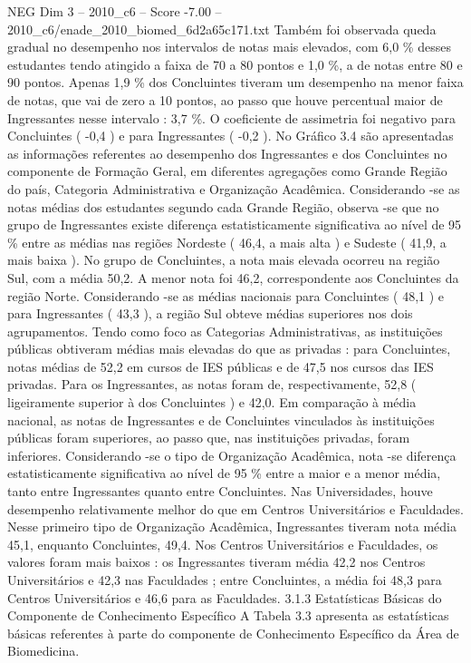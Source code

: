\begin{textsample}{NEG Dim 3 – 2010\_c6 – Score -7.00 – 2010\_c6/enade\_2010\_biomed\_6d2a65c171.txt}
Também foi observada queda gradual no desempenho nos intervalos de notas mais elevados, com 6,0 \% desses estudantes tendo atingido a faixa de 70 a 80 pontos e 1,0 \%, a de notas entre 80 e 90 pontos.
Apenas 1,9 \% dos Concluintes tiveram um desempenho na menor faixa de notas, que vai de zero a 10 pontos, ao passo que houve percentual maior de Ingressantes nesse intervalo : 3,7 \%.
O coeficiente de assimetria foi negativo para Concluintes ( -0,4 ) e para Ingressantes ( -0,2 ).
No Gráfico 3.4 são apresentadas as informações referentes ao desempenho dos Ingressantes e dos Concluintes no componente de Formação Geral, em diferentes agregações como Grande Região do país, Categoria Administrativa e Organização Acadêmica.
Considerando -se as notas médias dos estudantes segundo cada Grande Região, observa -se que no grupo de Ingressantes existe diferença estatisticamente significativa ao nível de 95 \% entre as médias nas regiões Nordeste ( 46,4, a mais alta ) e Sudeste ( 41,9, a mais baixa ).
No grupo de Concluintes, a nota mais elevada ocorreu na região Sul, com a média 50,2.
A menor nota foi 46,2, correspondente aos Concluintes da região Norte.
Considerando -se as médias nacionais para Concluintes ( 48,1 ) e para Ingressantes ( 43,3 ), a região Sul obteve médias superiores nos dois agrupamentos.
Tendo como foco as Categorias Administrativas, as instituições públicas obtiveram médias mais elevadas do que as privadas : para Concluintes, notas médias de 52,2 em cursos de IES públicas e de 47,5 nos cursos das IES privadas.
Para os Ingressantes, as notas foram de, respectivamente, 52,8 ( ligeiramente superior à dos Concluintes ) e 42,0.
Em comparação à média nacional, as notas de Ingressantes e de Concluintes vinculados às instituições públicas foram superiores, ao passo que, nas instituições privadas, foram inferiores.
Considerando -se o tipo de Organização Acadêmica, nota -se diferença estatisticamente significativa ao nível de 95 \% entre a maior e a menor média, tanto entre Ingressantes quanto entre Concluintes.
Nas Universidades, houve desempenho relativamente melhor do que em Centros Universitários e Faculdades.
Nesse primeiro tipo de Organização Acadêmica, Ingressantes tiveram nota média 45,1, enquanto Concluintes, 49,4.
Nos Centros Universitários e Faculdades, os valores foram mais baixos : os Ingressantes tiveram média 42,2 nos Centros Universitários e 42,3 nas Faculdades ; entre Concluintes, a média foi 48,3 para Centros Universitários e 46,6 para as Faculdades. 3.1.3 Estatísticas Básicas do Componente de Conhecimento Específico A Tabela 3.3 apresenta as estatísticas básicas referentes à parte do componente de Conhecimento Específico da Área de Biomedicina.

\end{textsample}
